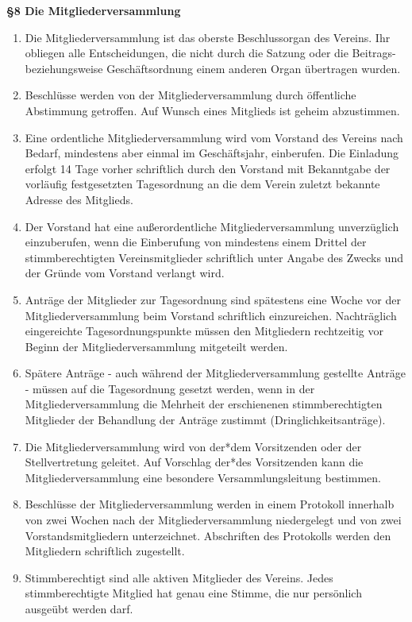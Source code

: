 \documentclass[a4paper,
               12pt,
               titlepage,
               parskip=half]{scrartcl}
\begin{document}
\textbf{§8 Die Mitgliederversammlung}
{\small
	\begin{enumerate}
		\item Die Mitgliederversammlung ist das oberste Beschlussorgan des Vereins. Ihr obliegen alle Entscheidungen, die nicht durch die Satzung oder die Beitrags- beziehungsweise Geschäftsordnung einem anderen Organ übertragen wurden.
		\item Beschlüsse werden von der Mitgliederversammlung durch öffentliche Abstimmung getroffen. Auf Wunsch eines Mitglieds ist geheim abzustimmen.
		\item Eine ordentliche Mitgliederversammlung wird vom Vorstand des Vereins nach Bedarf, mindestens aber einmal im Geschäftsjahr, einberufen. Die Einladung erfolgt 14 Tage vorher schriftlich durch den Vorstand mit Bekanntgabe der vorläufig festgesetzten Tagesordnung an die dem Verein zuletzt bekannte Adresse des Mitglieds.
		\item Der Vorstand hat eine außerordentliche Mitgliederversammlung unverzüglich einzuberufen,
		wenn die Einberufung von mindestens einem Drittel der stimmberechtigten Vereinsmitglieder schriftlich unter Angabe des Zwecks und der Gründe vom Vorstand verlangt wird.
		\item Anträge der Mitglieder zur Tagesordnung sind spätestens eine Woche vor der Mitgliederversammlung beim Vorstand schriftlich einzureichen. Nachträglich eingereichte Tagesordnungspunkte müssen den Mitgliedern rechtzeitig vor Beginn der Mitgliederversammlung mitgeteilt werden.
		\item Spätere Anträge - auch während der Mitgliederversammlung gestellte Anträge - müssen auf die Tagesordnung gesetzt werden, wenn in der Mitgliederversammlung die Mehrheit der erschienenen stimmberechtigten Mitglieder der Behandlung der Anträge zustimmt (Dringlichkeitsanträge).
		\item Die Mitgliederversammlung wird von der*dem Vorsitzenden oder der Stellvertretung geleitet. Auf Vorschlag der*des Vorsitzenden kann die Mitgliederversammlung eine besondere Versammlungsleitung bestimmen.
		\item Beschlüsse der Mitgliederversammlung werden in einem Protokoll innerhalb von zwei Wochen nach der Mitgliederversammlung niedergelegt und von zwei Vorstandsmitgliedern unterzeichnet. Abschriften des Protokolls werden den Mitgliedern schriftlich zugestellt.
		\item Stimmberechtigt sind alle aktiven Mitglieder des Vereins. Jedes stimmberechtigte Mitglied hat genau eine Stimme, die nur persönlich ausgeübt werden darf.

\end{enumerate}}
\end{document}
